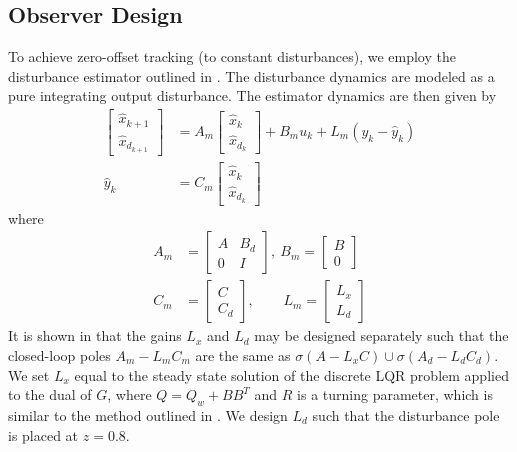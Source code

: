 \documentclass[journal,twocolumn,twoside]{IEEEtran}
\newcommand{\x}{\ensuremath{x }\xspace}
\begin{document}
\subsection{Observer Design}\label{sec:dist_est}
To achieve zero-offset tracking (to constant disturbances), we employ the disturbance estimator outlined in \cite{maeder_offset-free_2007}. The disturbance dynamics are modeled as a pure integrating output disturbance. The estimator dynamics are then given by
\begin{align}
  \begin{bmatrix} \hat{\x}_{k+1}\\ \hat{\x}_{d_{k+1}} \end{bmatrix}
  &= A_m
  \begin{bmatrix} \hat{\x}_{k}\\ \hat{\x}_{d_k}\end{bmatrix}
    + B_m u_k + L_m(y_k - \hat y_k) \label{eqn:obsdyn}\\
  \hat y_k &= C_m\begin{bmatrix} \hat{\x}_k\label{eqn:yhat}\\
    \hat{\x}_{d_k} \end{bmatrix}
\end{align}
where
\begin{align}
  A_m& = \begin{bmatrix}
    A & B_d \\ 0 & I
  \end{bmatrix},\:
  B_m =
  \begin{bmatrix}
    B \\ 0
  \end{bmatrix} \\
  C_m &= 
    \begin{bmatrix}
    C \\ C_d
  \end{bmatrix},\:\:\:\:\:\:\:\:\;
  L_m = \begin{bmatrix} L_x\\L_d \end{bmatrix} \label{eqn:CmLm}
\end{align}
It is shown in \cite{maeder_offset-free_2007} that the gains $L_x$ and $L_d$ may be designed separately such that the closed-loop poles $A_m - L_mC_m$ are the same as $\sigma(A-L_xC)\cup \sigma(A_d-L_dC_d)$.
We set $L_x$ equal to the steady state solution of the discrete LQR problem applied to the dual of $G$, where $Q = Q_w + BB^T$ and $R$ is a turning parameter, which is similar to the method outlined in \cite{doyle_robustness_1979}. We design $L_d$ such that the disturbance pole is placed at $z=0.8$.
\end{document}

